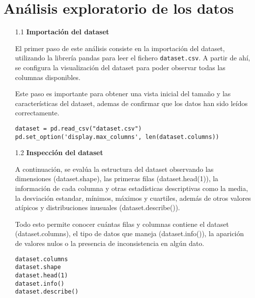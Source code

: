 \documentclass{article}
\begin{document}

\newpage

\section[1]{An\'alisis exploratorio de los datos}

\bigskip

\begin{itemize}

\item[1.1]  {\bf Importaci\'on del dataset}

El primer paso de este an\'alisis consiste en la importaci\'on del dataset, utilizando la librer\'ia pandas para leer el fichero \texttt{dataset.csv}. A partir de ah\'i, se configura la visualizaci\'on del dataset para poder observar todas las columnas disponibles.

Este paso es importante para obtener una vista inicial del tamaño y las caracter\'isticas del dataset, ademas de confirmar que los datos han sido le\'idos correctamente.

\begin{tcolorbox}[width=14cm]
\begin{scriptsize}
\begin{verbatim}
dataset = pd.read_csv("dataset.csv")
pd.set_option('display.max_columns', len(dataset.columns))
\end{verbatim}
\end{scriptsize}
\end{tcolorbox}

\end{itemize}

\bigskip

\begin{itemize}

\item[1.2]  {\bf Inspecci\'on del dataset}

A continuaci\'on, se eval\'ua la estructura del dataset observando las dimensiones (dataset.shape), las primeras filas (dataset.head(1)), la informaci\'on de cada columna y otras estad\'isticas descriptivas como la media, la desviaci\'on estandar, m\'inimos, m\'aximos y cuartiles, adem\'as de otros valores at\'ipicos y distribuciones inusuales (dataset.describe()).

Todo esto permite conocer cu\'antas filas y columnas contiene el dataset (dataset.columns), el tipo de datos que maneja (dataset.info()), la aparici\'on de valores nulos o la presencia de inconsistencia en alg\'un dato.

\begin{tcolorbox}[width=14cm]
\begin{scriptsize}
\begin{verbatim}
dataset.columns
dataset.shape
dataset.head(1)
dataset.info()
dataset.describe()
\end{verbatim}
\end{scriptsize}
\end{tcolorbox}

\end{itemize}
\end{document}
